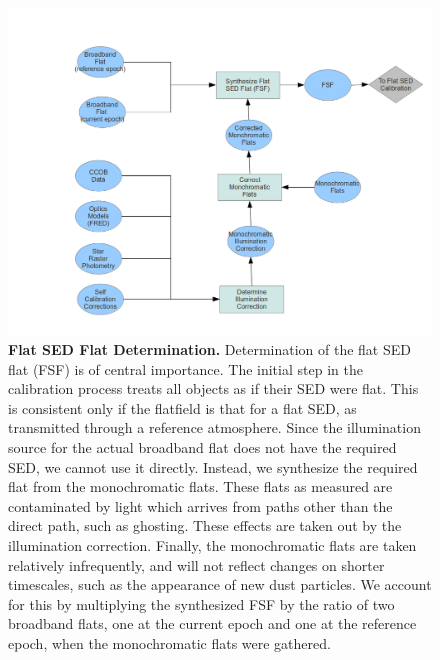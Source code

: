 \documentclass[12pt,preprint]{aastex}
\begin{document}
\begin{figure}[htbp]
\includegraphics[width=6.5in]{CalibDataProdSchematic2}
\caption{ {\small {\bf Flat SED Flat Determination.} Determination of the flat SED flat (FSF) is of central importance.  The initial step in the calibration process treats all objects as if their SED were flat.  This is consistent only if the flatfield is that for a flat SED, as transmitted through a reference atmosphere.  Since the illumination source for the actual broadband flat does not have the required SED, we cannot use it directly.  Instead, we synthesize the required flat from the monochromatic flats.  These flats as measured are contaminated by light which arrives from paths other than the direct path, such as ghosting.  These effects are taken out by the illumination correction.  Finally, the monochromatic flats are taken relatively infrequently, and will not reflect changes on shorter timescales, such as the appearance of new dust particles.  We account for this by multiplying the synthesized FSF by the ratio of two broadband flats, one at the current epoch and one at the reference epoch, when the monochromatic flats were gathered.}
\label{fig:overview_flowchart2} }
\end{figure}
\end{document}
